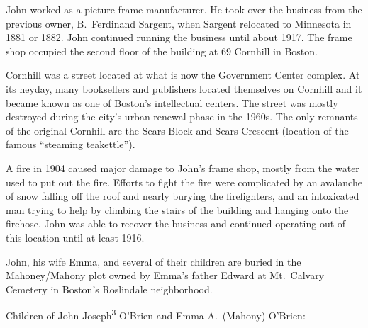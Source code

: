 John worked as a picture frame manufacturer.  He took over the business from the previous owner, B.\ Ferdinand Sargent,\cite{PictureFrameLabel} when Sargent relocated to Minnesota in 1881 or 1882.\cite{Minnesota} John continued running the business until about 1917.\cite{John3OBrien1916:1} The frame shop occupied the second floor of the building at 69 Cornhill in Boston.\cite{John3OBrien1916:2} 

Cornhill was a street located at what is now the Government Center complex. At its heyday, many booksellers and publishers located themselves on Cornhill and it became known as one of Boston's intellectual centers.\cite{Cornhill:1} The street was mostly destroyed during the city's urban renewal phase in the 1960s. The only remnants of the original Cornhill are the Sears Block and Sears Crescent (location of the famous ``steaming teakettle'').\cite{Cornhill:2}

A fire in 1904 caused major damage to John's frame shop, mostly from the water used to put out the fire. Efforts to fight the fire were complicated by an avalanche of snow falling off the roof and nearly burying the firefighters, and an intoxicated man trying to help by climbing the stairs of the building and hanging onto the firehose.\cite{FrameShopFire:2} John was able to recover the business and continued operating out of this location until at least 1916.\cite{John3OBrien1916:3}

John, his wife Emma, and several of their children are buried in the Mahoney/Mahony plot owned by Emma's father Edward at Mt.\ Calvary Cemetery in Boston's Roslindale neighborhood.\cite{John3OBrienBurial:2}

\begin{KidsIntro}
	Children of John Joseph\textsuperscript{3} O'Brien and Emma A.\ (Mahony) O'Brien:
\end{KidsIntro}

